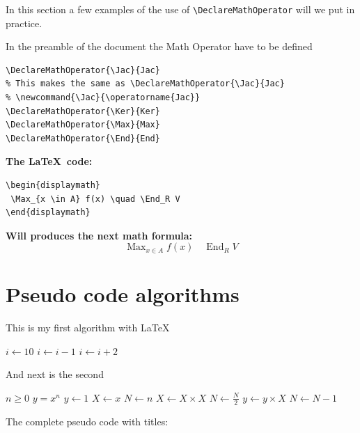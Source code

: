 \documentclass[12pt,a4paper]{article}
\theoremstyle{definition}
\theoremstyle{remark}
\DeclareMathOperator{\Jac}{Jac}
\DeclareMathOperator{\Ker}{Ker}
\DeclareMathOperator{\Max}{Max}
\DeclareMathOperator{\End}{End}
\begin{document}
In this section a few examples of the use of 
\verb|\DeclareMathOperator| will we put in practice.

In the preamble of the document the Math Operator have to be defined 
\begin{verbatim}
\DeclareMathOperator{\Jac}{Jac}
% This makes the same as \DeclareMathOperator{\Jac}{Jac}
% \newcommand{\Jac}{\operatorname{Jac}}
\DeclareMathOperator{\Ker}{Ker}
\DeclareMathOperator{\Max}{Max}
\DeclareMathOperator{\End}{End}
\end{verbatim}

\bigskip
\begin{minipage}[t]{0.55\textwidth}
\textbf{The \LaTeX \ code:}
\begin{verbatim}
\begin{displaymath}
 \Max_{x \in A} f(x) \quad \End_R V 
\end{displaymath}
\end{verbatim}
\end{minipage}
\vline\hfill
\begin{minipage}[t]{0.35\textwidth}
\textbf{Will produces the next math formula:}
\begin{displaymath}
 \Max_{x \in A} f(x) \quad \End_R V 
\end{displaymath}
\end{minipage}


\section{Pseudo code algorithms}\label{sec:pseudo_code}

This is my first algorithm with \LaTeX

\begin{algorithmic}[1]
\State $i \gets 10$
    \State $i \gets i-1$
\Else
        \State $i \gets i+2$
    \EndIf
\EndIf 
\end{algorithmic}

\bigskip 
And next is the second
\begin{algorithmic}
\Require $n \geq 0$
\Ensure $y = x^n$
\State $y \gets 1$
\State $X \gets x$
\State $N \gets n$
    \State $X \gets X \times X$
    \State $N \gets \frac{N}{2}$  
    \State $y \gets y \times X$
    \State $N \gets N - 1$
\EndIf
\EndWhile
\end{algorithmic}



The complete pseudo code with titles:
\end{document}
